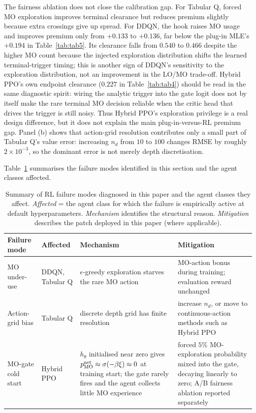 \documentclass[]{interact}
\theoremstyle{plain}
\theoremstyle{definition}
\theoremstyle{remark}
\newcommand{\1}[1]{\mathbf{1}_{\{#1\}}}
\begin{document}
The fairness ablation does not close the calibration gap. For Tabular Q, forced MO exploration improves terminal clearance but reduces premium slightly because extra crossings give up spread. For DDQN, the hook raises MO usage and improves premium only from $+0.133$ to $+0.136$, far below the plug-in MLE's $+0.194$ in Table~\ref{tab:tab5}. Its clearance falls from $0.540$ to $0.466$ despite the higher MO count because the injected exploration distribution shifts the learned terminal-trigger timing; this is another sign of DDQN's sensitivity to the exploration distribution, not an improvement in the LO/MO trade-off. Hybrid PPO's own endpoint clearance ($0.227$ in Table~\ref{tab:tab4}) should be read in the same diagnostic spirit: wiring the analytic trigger into the gate logit does not by itself make the rare terminal MO decision reliable when the critic head that drives the trigger is still noisy. Thus Hybrid PPO's exploration privilege is a real design difference, but it does not explain the main plug-in-versus-RL premium gap. Panel (b) shows that action-grid resolution contributes only a small part of Tabular Q's value error: increasing $n_d$ from $10$ to $100$ changes RMSE by roughly $2\times10^{-3}$, so the dominant error is not merely depth discretisation.

Table~\ref{tab:tab-failure} summarises the failure modes identified in this section and the agent classes affected.

\begin{table}[t]
\centering
\caption{Summary of RL failure modes diagnosed in this paper and the agent classes they affect. \emph{Affected} = the agent class for which the failure is empirically active at default hyperparameters. \emph{Mechanism} identifies the structural reason. \emph{Mitigation} describes the patch deployed in this paper (where applicable).}
\label{tab:tab-failure}
\small
\begin{tabular}{@{}p{2.3cm}p{2.2cm}p{4.1cm}p{5.0cm}@{}}
\toprule
Failure mode & Affected & Mechanism & Mitigation \\
\midrule
MO under-use & DDQN, Tabular Q & $\epsilon$-greedy exploration starves the rare MO action & MO-action bonus during training; evaluation reward unchanged \\
Action-grid bias & Tabular Q & discrete depth grid has finite resolution & increase $n_d$, or move to continuous-action methods such as Hybrid PPO \\
MO-gate cold start & Hybrid PPO & $h_\theta$ initialised near zero gives $p_{\rm MO}^{\rm net} \approx \sigma(-\beta\xi) \approx 0$ at training start; the gate rarely fires and the agent collects little MO experience & forced $5\%$ MO-exploration probability mixed into the gate, decaying linearly to zero; A/B fairness ablation reported separately \\
\bottomrule
\end{tabular}
\end{table}
\end{document}
